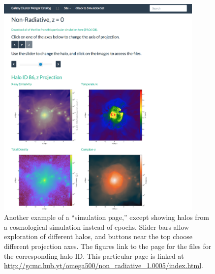 \documentclass{emulateapj}
\begin{document}
\begin{figure}
\begin{center}
\includegraphics[width=0.9\textwidth]{halos_page.eps}
\caption{Another example of a ``simulation page,'' except showing halos from a cosmological simulation instead of epochs. Slider bars allow exploration of different halos, and buttons near the top choose different projection axes. The figures link to the page for the files for the corresponding halo ID. This particular page is linked at \url{http://gcmc.hub.yt/omega500/non_radiative_1.0005/index.html}.}
\end{center}
\end{figure}
\end{document}
